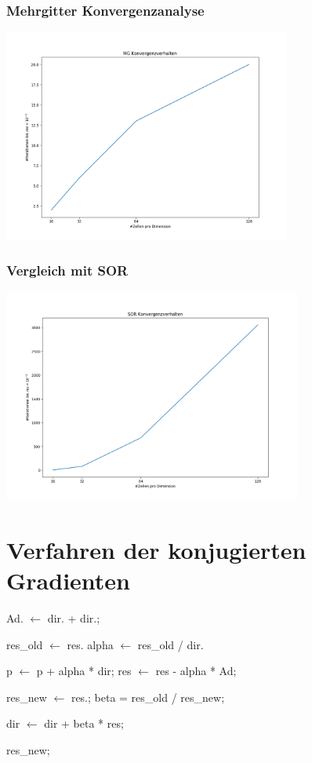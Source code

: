 \documentclass[]{beamer}
\begin{document}
\begin{frame}
  \frametitle{Mehrgitter Konvergenzanalyse}
  \begin{center}
    \includegraphics[width=0.9\linewidth, height=7cm]{mg_konvergenzverhalten.png}
  \end{center}
\end{frame}

\begin{frame}
  \frametitle{Vergleich mit SOR}
  \begin{center}
    \includegraphics[width=0.9\linewidth, height=7cm]{mg_vs_sor.png}
  \end{center}
\end{frame}

\section{Verfahren der konjugierten Gradienten}
\begin{frame}
  \begin{algorithmic}
     \State Ad. $\gets$ dir. + dir.;
    \EndFor

    \State res\_old $\gets$ res.
    \State alpha $\gets $ res\_old / dir.


     \State p $\gets$ p + alpha * dir;
     \State res $\gets$ res - alpha * Ad;


    \State res\_new $\gets$ res.;
    \State beta = res\_old / res\_new;

    \State dir $\gets$ dir + beta * res;

    \State \Return res\_new;
    \EndFunction
  \end{algorithmic}
\end{frame}
\end{document}
